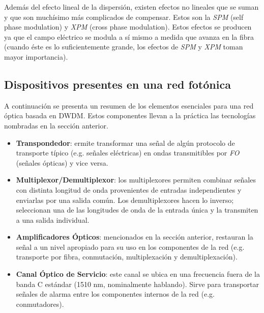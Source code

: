 Además del efecto lineal de la dispersión, existen efectos no lineales
que se suman y que son muchísimo más complicados de compensar. Estos
son la \emph{SPM} (self phase modulation) y \emph{XPM} (cross phase
modulation). Estos efectos se producen ya que el campo eléctrico se
modula a sí mismo a medida que avanza en la fibra (cuando éste es lo
suficientemente grande, los efectos de \emph{SPM} y \emph{XPM} toman
mayor importancia).

\subsection{Dispositivos presentes en una red fotónica}
\label{sec:dispositivos}

A continuación se presenta un resumen de los elementos esenciales para
una red óptica basada en DWDM. Estos componentes llevan a la práctica
las tecnologías nombradas en la sección anterior.

\begin{itemize}
\item \textbf{Transpondedor}: ermite transformar una señal de
  algún protocolo de transporte típico (e.g. señales eléctricas) en
  ondas transmitibles por \emph{FO} (señales ópticas) y vice versa.
\item \textbf{Multiplexor/Demultiplexor}: los multiplexores permiten
  combinar señales con distinta longitud de onda provenientes de 
  entradas independientes y enviarlas por una salida común. Los
  demultiplexores hacen lo inverso; seleccionan una de las longitudes
  de onda de la entrada única y la transmiten a una salida individual.
\item \textbf{Amplificadores Ópticos}: mencionados en la sección 
  anterior, restauran la señal a un nivel apropiado para su uso en
  los componentes de la red (e.g. transporte por fibra, conmutación, 
  multiplexación y demultiplexación).
\item \textbf{Canal Óptico de Servicio}: este canal se ubica en una
  frecuencia fuera de la banda C estándar (1510 nm, nominalmente
  hablando). Sirve para transportar señales de alarma entre los
  componentes internos de la red (e.g. conmutadores).
\end{itemize}
